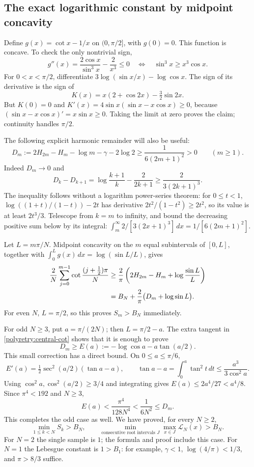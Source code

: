 \documentclass[11pt]{article}
\theoremstyle{remark}
\numberwithin{equation}{section}
\begin{document}
\subsection{The exact logarithmic constant by midpoint concavity}

Define $g(x)=\cot x-1/x$ on $(0,\pi/2]$, with $g(0)=0$.
This function is concave.  To check the only nontrivial sign,
\[
 g''(x)=\frac{2\cos x}{\sin^3x}-\frac2{x^3}\le0
 \quad\Longleftrightarrow\quad
 \sin^3x\ge x^3\cos x.
\]
For $0<x<\pi/2$, differentiate
$3\log(\sin x/x)-\log\cos x$.  The sign of its derivative is
the sign of
\[
 K(x)=x(2+\cos2x)-\tfrac32\sin2x.
\]
But $K(0)=0$ and
$K'(x)=4\sin x(\sin x-x\cos x)\ge0$, because
$(\sin x-x\cos x)'=x\sin x\ge0$.  Taking the limit at zero
proves the claim; continuity handles $\pi/2$.

The following explicit harmonic remainder will also be useful:
\begin{equation}\label{polyretry:harmonic-remainder}
 D_m:=2H_{2m}-H_m-\log m-\gamma-2\log2
 \ge\frac1{6(2m+1)^2}>0\qquad(m\ge1).
\end{equation}
Indeed $D_m\to0$ and
\[
 D_k-D_{k+1}
 =\log\frac{k+1}{k}-\frac2{2k+1}
 \ge\frac{2}{3(2k+1)^3}.
\]
The inequality follows without a logarithm power-series theorem:
for $0\le t<1$,
$\log((1+t)/(1-t))-2t$ has derivative
$2t^2/(1-t^2)\ge2t^2$, so its value is at least $2t^3/3$.
Telescope from $k=m$ to infinity, and bound the decreasing positive
sum below by its integral:
$\int_m^\infty2/[3(2x+1)^3]\,dx=1/[6(2m+1)^2]$.

Let $L=m\pi/N$.  Midpoint concavity on the $m$ equal subintervals
of $[0,L]$, together with
$\int_0^L g(x)\,dx=\log(\sin L/L)$, gives
\begin{align}
 \frac2N\sum_{j=0}^{m-1}\cot\frac{(j+\tfrac12)\pi}{N}
 &\ge\frac2\pi\left(2H_{2m}-H_m+
                  \log\frac{\sin L}{L}\right)\notag\\
 &=B_N+\frac2\pi\bigl(D_m+\log\sin L\bigr).
 \label{polyretry:midpoint-bound}
\end{align}
For even $N$, $L=\pi/2$, so this proves $S_m>B_N$ immediately.

For odd $N\ge3$, put $a=\pi/(2N)$; then $L=\pi/2-a$.
The extra tangent in \eqref{polyretry:central-cot} shows that it is
enough to prove
\[
 D_m\ge E(a):=-\log\cos a-a\tan(a/2).
\]
This small correction has a direct bound.  On $0\le a\le\pi/6$,
\[
 E'(a)=\tfrac12\sec^2(a/2)(\tan a-a),\qquad
 \tan a-a=\int_0^a\tan^2t\,dt\le\frac{a^3}{3\cos^2a}.
\]
Using $\cos^2a,\cos^2(a/2)\ge3/4$ and integrating gives
$E(a)\le2a^4/27<a^4/8$.  Since $\pi^4<192$ and $N\ge3$,
\[
 E(a)<\frac{\pi^4}{128N^4}<\frac1{6N^2}\le D_m.
\]
This completes the odd case as well.  We have proved, for every $N\ge2$,
\begin{equation}\label{polyretry:all-intervals}
 \min_{1\le k<N}S_k>B_N,
 \qquad
 \min_{\text{consecutive root intervals }J}
            \max_{x\in J}\mathcal L_N(x)>B_N.
\end{equation}
For $N=2$ the single sample is $1$; the formula and proof include this
case.  For $N=1$ the Lebesgue constant is $1>B_1$: for example,
$\gamma<1$, $\log(4/\pi)<1/3$, and $\pi>8/3$ suffice.
\end{document}
